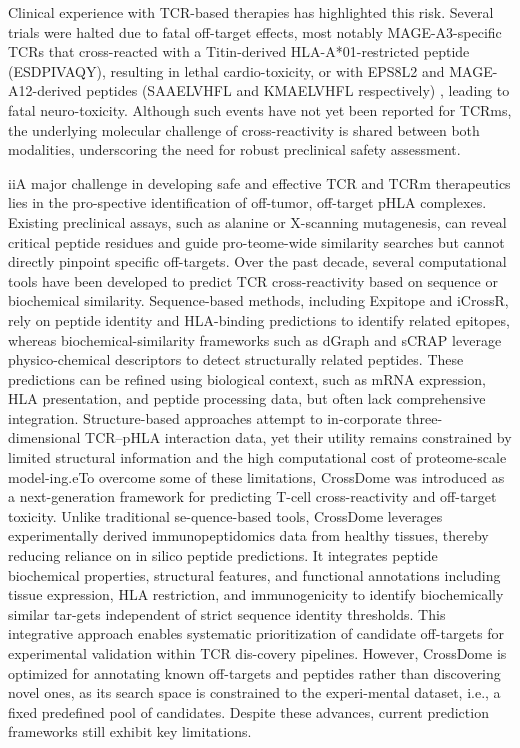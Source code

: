 \documentclass[unnumsec,webpdf,contemporary,large]{oup-authoring-template}%
\theoremstyle{thmstyleone}%
\theoremstyle{thmstyletwo}%
\theoremstyle{thmstylethree}%
\begin{document}
    Clinical experience with TCR-based therapies has highlighted this risk. Several trials were halted due to fatal off-target effects, most notably MAGE-A3-specific TCRs that cross-reacted with a Titin-derived HLA-A*01-restricted peptide (ESDPIVAQY), resulting in lethal cardio-toxicity, or with EPS8L2 and MAGE-A12-derived peptides (SAAELVHFL and KMAELVHFL respectively) \cite{morgan2013cancer, martin2021re}, leading to fatal neuro-toxicity. Although such events have not yet been reported for TCRms, the underlying molecular challenge of cross-reactivity is shared between both modalities, underscoring the need for robust preclinical safety assessment.

    iiA major challenge in developing safe and effective TCR and TCRm therapeutics lies in the pro-spective identification of off-tumor, off-target pHLA complexes. Existing preclinical assays, such as alanine or X-scanning mutagenesis, can reveal critical peptide residues and guide pro-teome-wide similarity searches but cannot directly pinpoint specific off-targets. 
    Over the past decade, several computational tools have been developed to predict TCR cross-reactivity based on sequence or biochemical similarity. Sequence-based methods, including Expitope and iCrossR, rely on peptide identity and HLA-binding predictions to identify related epitopes, whereas biochemical-similarity frameworks such as dGraph and sCRAP leverage physico-chemical descriptors to detect structurally related peptides. These predictions can be refined using biological context, such as mRNA expression, HLA presentation, and peptide processing data, but often lack comprehensive integration. Structure-based approaches attempt to in-corporate three-dimensional TCR–pHLA interaction data, yet their utility remains constrained by limited structural information and the high computational cost of proteome-scale model-ing.eTo overcome some of these limitations, CrossDome was introduced as a next-generation framework for predicting T-cell cross-reactivity and off-target toxicity. 
    Unlike traditional se-quence-based tools, CrossDome leverages experimentally derived immunopeptidomics data from healthy tissues, thereby reducing reliance on in silico peptide predictions. It integrates peptide biochemical properties, structural features, and functional annotations including tissue expression, HLA restriction, and immunogenicity to identify biochemically similar tar-gets independent of strict sequence identity thresholds. This integrative approach enables systematic prioritization of candidate off-targets for experimental validation within TCR dis-covery pipelines. However, CrossDome is optimized for annotating known off-targets and peptides rather than discovering novel ones, as its search space is constrained to the experi-mental dataset, i.e., a fixed predefined pool of candidates. Despite these advances, current prediction frameworks still exhibit key limitations. 
\end{document}
